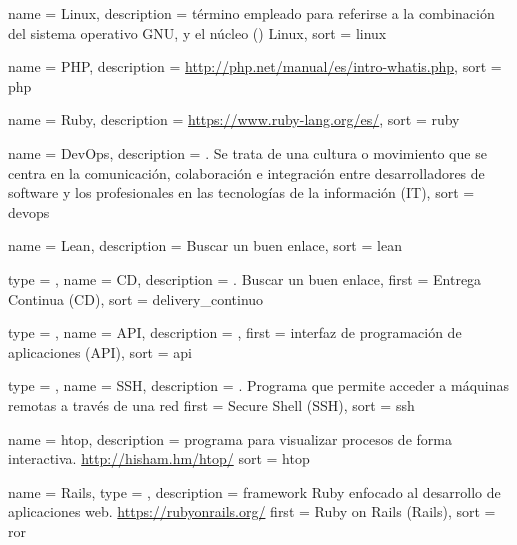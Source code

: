  {
  name        = {Linux},
  description =
    {término empleado para referirse a la combinación del sistema operativo
    GNU, y el núcleo () Linux},
  sort        = {linux}
}

 {
  name        = {PHP},
  description =
    {
    \url{http://php.net/manual/es/intro-whatis.php}},
  sort        = {php}
}

 {
  name        = {Ruby},
  description = {\url{https://www.ruby-lang.org/es/}},
  sort        = {ruby}
}

 {
  name        = {DevOps},
  description =
    {. Se trata de una cultura o movimiento que se
    centra en la comunicación, colaboración e integración entre desarrolladores
    de software y los profesionales en las tecnologías de la información
    (IT)},
  sort        = {devops}
}

 {
  name        = {Lean},
  description = {Buscar un buen enlace},
  sort        = {lean}
}

 {
  type        = \acronymtype,
  name        = {CD},
  description = {. Buscar un buen enlace},
  first       = {Entrega Continua (CD)},
  sort        = {delivery_continuo}
}

 {
  type        = \acronymtype,
  name        = {API},
  description = {},
  first       = {interfaz de programación de aplicaciones (API)},
  sort        = {api}
}

 {
  type        = \acronymtype,
  name        = {SSH},
  description =
    {. Programa que permite acceder a máquinas remotas a
    través de una red}
  first       = {Secure Shell (SSH)},
  sort        = {ssh}
}

 {
  name        = {htop},
  description =
    {programa para visualizar procesos de forma interactiva.
    \url{http://hisham.hm/htop/}}
  sort        = {htop}
}

 {
  name        = {Rails},
  type        = \acronymtype,
  description =
    {framework Ruby enfocado al desarrollo de aplicaciones web.
    \url{https://rubyonrails.org/}}
  first       = {Ruby on Rails (Rails)},
  sort        = {ror}
}

